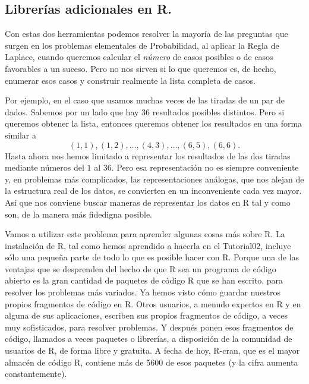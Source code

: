 \documentclass[10pt,a4paper]{article}\usepackage[]{graphicx}\usepackage[]{color}
\newcounter {cont01}
\begin{document}
           \subsection{Librerías adicionales en R.}
      \label{tut03:subsec:LibreriasAdicionalesR}
      
      Con estas dos herramientas podemos resolver la mayoría de las preguntas que surgen en los problemas elementales de Probabilidad, al aplicar la Regla de Laplace, cuando queremos calcular el {\em número} de casos posibles o de casos favorables a un suceso. Pero no nos sirven si lo que queremos es, de hecho, enumerar esos casos y construir realmente la lista completa de casos.
      
      Por ejemplo, en el caso que usamos muchas veces de las tiradas de un par de dados. Sabemos por un lado que hay 36 resultados posibles distintos. Pero si queremos obtener la lista, entonces queremos obtener los resultados en una forma similar a
      \[(1,1) , (1,2), \ldots, (4,3), \ldots,(6,5), (6,6).\]
      Hasta ahora nos hemos limitado a representar los resultados de las dos tiradas mediante números del $1$ al $36$. Pero  esa representación no es siempre conveniente y, en problemas más complicados, las representaciones análogas, que nos alejan de la estructura real de los datos, se convierten en un inconveniente cada vez mayor. Así que nos conviene buscar maneras de representar los datos en R tal y como son, de la manera más fidedigna posible.
      
      Vamos a utilizar este problema para aprender algunas cosas más sobre R. La instalación de R, tal como hemos aprendido a hacerla en el Tutorial02, incluye sólo una pequeña parte de todo lo que es posible hacer con R. Porque una de las ventajas que se desprenden del hecho de que R sea un programa de código abierto es la gran cantidad de paquetes de código R que se han escrito, para resolver los problemas más variados. Ya hemos visto cómo guardar nuestros propios fragmentos de código en R. Otros usuarios, a menudo expertos en R y en alguna de sus aplicaciones, escriben sus propios fragmentos de código, a veces muy sofisticados, para resolver problemas. Y después ponen esos fragmentos de código, llamados a veces paquetes o librerías,  a disposición de la comunidad de usuarios de R, de forma libre y gratuita. A fecha de hoy, R-cran, que es el mayor almacén de código R, contiene más de 5600 de esos paquetes (y la cifra aumenta constantemente).
      
\end{document}
